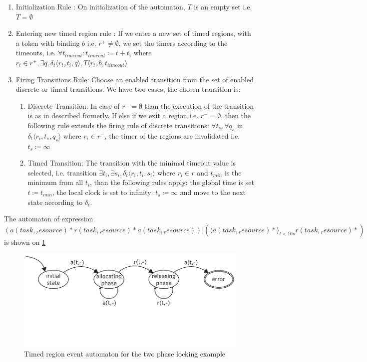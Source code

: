 				\begin{enumerate}
					\item Initialization Rule : On initialization of the automaton, $T$ is an empty set
					i.e. $T = \emptyset$
				
					\item Entering new timed region rule :
					If we enter a new set of timed regions, with a token with binding $b$ 
					i.e. $r^+ \neq \emptyset$, 
					we set the timers according to the timeouts, 
					i.e. $\forall t_{timeout} : t_{timeout} \coloneqq t + t_i $ where $ r_t \in r^+, \exists q ,\delta_t\langle  r_t,t_i,q \rangle, T \langle r_t,b, t_{timeout} \rangle$
					
					\item Firing Transitions Rule: Choose an enabled transition from the set of enabled discrete or timed transitions. 
					We have two cases, the chosen transition is:
						\begin{enumerate}
							\item Discrete Transition: In case of $r^- = \emptyset$ than the execution of the transition is as in described formerly. 
								If else if we exit a region i.e. $r^- = \emptyset$, 
								then the following rule extends the firing rule of discrete transitions:
								$\forall t_s, \forall q_s$ in $ \delta_t \langle r_i, t_s, q_s \rangle$ where $r_i \in r^-$, the timer of the regions are invalidated i.e.
								$t_s \coloneqq \infty$
							\item Timed Transition: The transition with the minimal timeout value is selected, 
								 i.e. transition $\exists t_i, \exists s_i, \delta_t \langle r_i, t_i, s_i \rangle$ where $ r_i \in r$ and $t_{min}$ is the minimum from all $t_i$,
								 than the following rules apply:
								 the global time is set $t \coloneqq t_{min}$, 
								 the local clock is set to infinity: $t_s \coloneqq \infty$ 
								 and move to the next state according to $\delta_t$.
						\end{enumerate}			
				\end{enumerate}

				The automaton of expression $(a(\mathit{task},\mathit{_resource})\ast r(\mathit{task},\mathit{_resource})\ast a(\mathit{task},\mathit{_resource}))|
				( \langle a(\mathit{task},\mathit{_resource}) \ast \rangle_{t < 10 s} r(\mathit{task},\mathit{_resource}) \ast)$
				is shown on \cref{fig:cep:ptrea}
				
				\begin{figure}[h]
				\centering
				\includegraphics[width=0.7\linewidth]{include/figures/chapter_5/illustration_3}
				\caption{Timed region event automaton for the two phase locking example}
				\label{fig:cep:ptrea}
				\end{figure}
				
